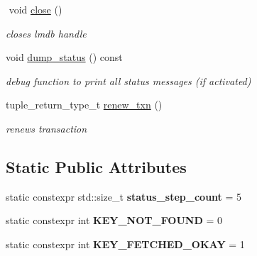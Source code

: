 \begin{DoxyCompactItemize}
$$\mbox{\label{structmods_1_1lmdb_1_1__db__handle_a42ebed3ed5afb3673b97f424fc003179}} 
void \hyperlink{structmods_1_1lmdb_1_1__db__handle_a42ebed3ed5afb3673b97f424fc003179}{close} ()
\begin{DoxyCompactList}\small\item\em closes lmdb handle \end{DoxyCompactList}\item 
\mbox{\label{structmods_1_1lmdb_1_1__db__handle_a4eeaec221b54aafb0ecf7f67fe5baf82}} 
void \hyperlink{structmods_1_1lmdb_1_1__db__handle_a4eeaec221b54aafb0ecf7f67fe5baf82}{dump\+\_\+status} () const
\begin{DoxyCompactList}\small\item\em debug function to print all status messages (if activated) \end{DoxyCompactList}\item 
tuple\+\_\+return\+\_\+type\+\_\+t \hyperlink{structmods_1_1lmdb_1_1__db__handle_a93d43cfa607ecd743bcba325e658e9c6}{renew\+\_\+txn} ()
\begin{DoxyCompactList}\small\item\em renews transaction \end{DoxyCompactList}\end{DoxyCompactItemize}
\subsection*{Static Public Attributes}
\begin{DoxyCompactItemize}
\item 
\mbox{\label{structmods_1_1lmdb_1_1__db__handle_a519bd0169f07df34cf61f424b217dc1e}} 
static constexpr std\+::size\+\_\+t {\bfseries status\+\_\+step\+\_\+count} = 5
\item 
\mbox{\label{structmods_1_1lmdb_1_1__db__handle_ac33ded24f41a4f32c3b2a22238bdecc7}} 
static constexpr int {\bfseries K\+E\+Y\+\_\+\+N\+O\+T\+\_\+\+F\+O\+U\+ND} = 0
\item 
\mbox{\label{structmods_1_1lmdb_1_1__db__handle_a93a0e99651faadc18dc46cd940819600}} 
static constexpr int {\bfseries K\+E\+Y\+\_\+\+F\+E\+T\+C\+H\+E\+D\+\_\+\+O\+K\+AY} = 1
\end{DoxyCompactItemize}


